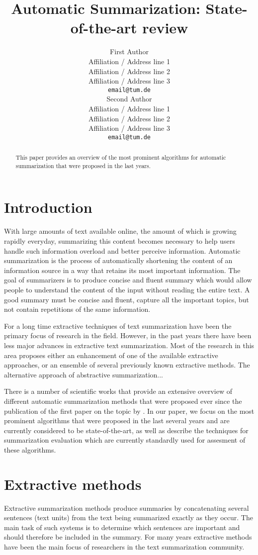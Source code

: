 \documentclass[11pt,a4paper,onecolumn]{article}
\title{Automatic Summarization: State-of-the-art review}
\author{First Author \\
  Affiliation / Address line 1 \\
  Affiliation / Address line 2 \\
  Affiliation / Address line 3 \\
  {\tt email@tum.de} \\\And
  Second Author \\
  Affiliation / Address line 1 \\
  Affiliation / Address line 2 \\
  Affiliation / Address line 3 \\
  {\tt email@tum.de} \\}
\date{}
\begin{document}
\maketitle
\begin{abstract}
This paper provides an overview of the most prominent algorithms for automatic summarization that were proposed in the last years.
\end{abstract}


\section{Introduction}
With large amounts of text available online, the amount of which is growing rapidly everyday, summarizing this content becomes necessary to help users handle such information overload and better perceive information.
Automatic summarization is the process of automatically shortening the content of an information source in a way that retains its most important information.
The goal of summarizers is to produce concise and fluent summary which would allow people to understand the content of the input without reading the entire text.
A good summary must be concise and fluent, capture all the important topics, but not contain repetitions of the same information.

For a long time extractive techniques of text summarization have been the primary focus of research in the field.
However, in the past years there have been less major advances in extractive text summarization.
Most of the research in this area proposes either an enhancement of one of the available extractive approaches, or an ensemble of several previously known extractive methods.
The alternative approach of abstractive summarization...

There is a number of scientific works \cite{nenkova2011automatic, lloret2012text, saggion2013automatic} that provide an extensive overview of different automatic summarization methods that were proposed ever since the publication of the first paper on the topic by \cite{luhn1958automatic}.
In our paper, we focus on the most prominent algorithms that were proposed in the last several years and are currently considered to be state-of-the-art, as well as describe the techniques for summarization evaluation which are currently standardly used for assesment of these algorithms.


\section{Extractive methods}
Extractive summarization methods produce summaries by concatenating several sentences (text units) from the text being summarized exactly as they occur.
The main task of such systems is to determine which sentences are important and should therefore be included in the summary.
For many years extractive methods have been the main focus of researchers in the text summarization community.
\end{document}
